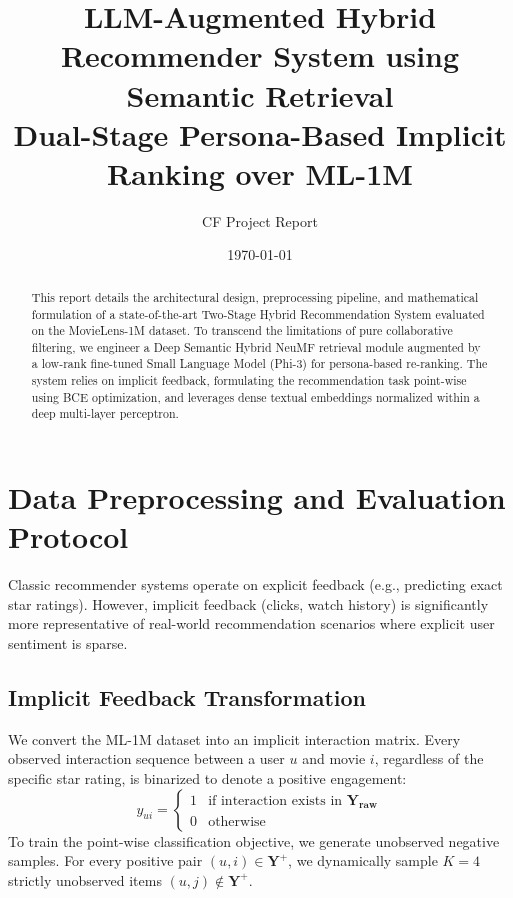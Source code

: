 \documentclass[11pt,a4paper]{article}
\title{\textbf{LLM-Augmented Hybrid Recommender System using Semantic Retrieval} \\
\large Dual-Stage Persona-Based Implicit Ranking over ML-1M}
\author{CF Project Report}
\date{\today}
\begin{document}
\maketitle

\begin{abstract}
This report details the architectural design, preprocessing pipeline, and mathematical formulation of a state-of-the-art Two-Stage Hybrid Recommendation System evaluated on the MovieLens-1M dataset. To transcend the limitations of pure collaborative filtering, we engineer a Deep Semantic Hybrid NeuMF retrieval module augmented by a low-rank fine-tuned Small Language Model (Phi-3) for persona-based re-ranking. The system relies on implicit feedback, formulating the recommendation task point-wise using BCE optimization, and leverages dense textual embeddings normalized within a deep multi-layer perceptron. 
\end{abstract}

\section{Data Preprocessing and Evaluation Protocol}
Classic recommender systems operate on explicit feedback (e.g., predicting exact star ratings). However, implicit feedback (clicks, watch history) is significantly more representative of real-world recommendation scenarios where explicit user sentiment is sparse. 

\subsection{Implicit Feedback Transformation}
We convert the ML-1M dataset into an implicit interaction matrix. Every observed interaction sequence between a user $u$ and movie $i$, regardless of the specific star rating, is binarized to denote a positive engagement:
\begin{equation}
    y_{ui} = 
    \begin{cases} 
      1 & \text{if interaction exists in } \mathbf{Y_{raw}} \\
      0 & \text{otherwise}
   \end{cases}
\end{equation}
To train the point-wise classification objective, we generate unobserved negative samples. For every positive pair $(u, i) \in \mathbf{Y^+}$, we dynamically sample $K=4$ strictly unobserved items $(u, j) \notin \mathbf{Y^+}$.
\end{document}
